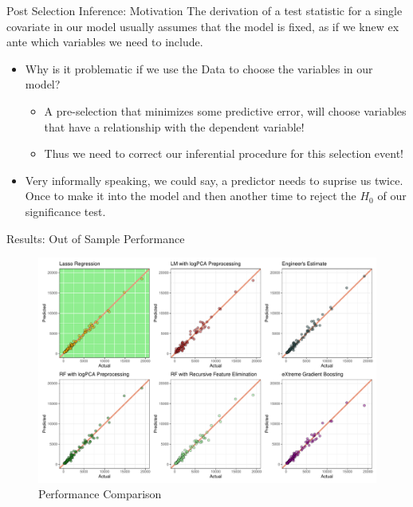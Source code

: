 \documentclass[
  11pt,
  ignorenonframetext,
]{beamer}
\providecommand{\tightlist}{%
  \setlength{\itemsep}{0pt}\setlength{\parskip}{0pt}}
\begin{document}
\begin{frame}{Post Selection Inference: Motivation}
\protect\hypertarget{post-selection-inference-motivation}{}
The derivation of a test statistic for a single covariate in our model
usually assumes that the model is fixed, as if we knew ex ante which
variables we need to include.

\begin{itemize}
\tightlist
\item
  Why is it problematic if we use the Data to choose the variables in
  our model?

  \begin{itemize}
  \tightlist
  \item
    A pre-selection that minimizes some predictive error, will choose
    variables that have a relationship with the dependent variable!
  \item
    Thus we need to correct our inferential procedure for this selection
    event!
  \end{itemize}
\item
  Very informally speaking, we could say, a predictor needs to suprise
  us twice. Once to make it into the model and then another time to
  reject the \(H_0\) of our significance test.
\end{itemize}
\end{frame}

\begin{frame}{Results: Out of Sample Performance}
\protect\hypertarget{results-out-of-sample-performance}{}
\begin{figure}

{\centering \includegraphics[width=0.9\linewidth]{./../figures/percomp_pres} 

}

\caption{Performance Comparison}\label{fig:unnamed-chunk-5}
\end{figure}
\end{frame}
\end{document}
